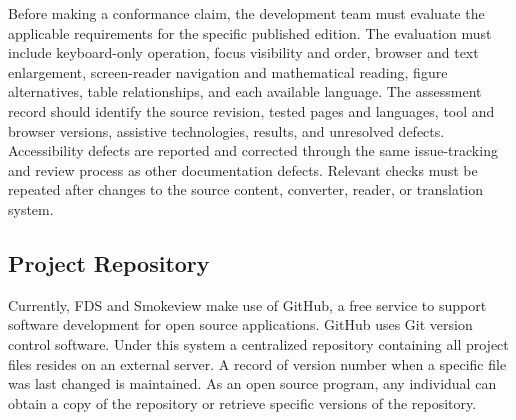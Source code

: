 \documentclass[11pt]{book}
\begin{document}
Before making a conformance claim, the development team must evaluate the applicable requirements for the specific published edition. The evaluation must include keyboard-only operation, focus visibility and order, browser and text enlargement, screen-reader navigation and mathematical reading, figure alternatives, table relationships, and each available language. The assessment record should identify the source revision, tested pages and languages, tool and browser versions, assistive technologies, results, and unresolved defects. Accessibility defects are reported and corrected through the same issue-tracking and review process as other documentation defects. Relevant checks must be repeated after changes to the source content, converter, reader, or translation system.


\subsection{Project Repository}

Currently, FDS and Smokeview make use of GitHub, a free service to support software development for open source applications. GitHub uses Git version control software. Under this system a centralized repository containing all project files resides on an external server.   A record of version number when a specific file was last changed is maintained. As an open source program, any individual can obtain a copy of the repository or retrieve specific versions of the repository.
\end{document}

